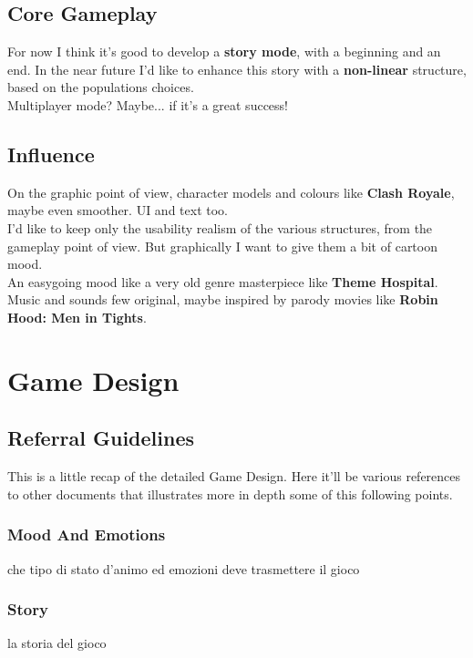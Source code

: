 \documentclass[a4paper]{scrreprt}
\begin{document}
\section{Core Gameplay}
For now I think it's good to develop a \textbf{story mode}, with a beginning and an end. In the near future I'd like to enhance this story with a \textbf{non-linear} structure, based on the populations choices.\\
Multiplayer mode? Maybe... if it's a great success!

\section{Influence}
On the graphic point of view, character models and colours like \textbf{Clash Royale}, maybe even smoother. UI and text too.\\
I'd like to keep only the usability realism of the various structures, from the gameplay point of view. But graphically I want to give them a bit of cartoon mood.\\
An easygoing mood like a very old genre masterpiece like \textbf{Theme Hospital}.\\
Music and sounds few original, maybe inspired by parody movies like \textbf{Robin Hood: Men in Tights}.


\chapter{Game Design} 

\section{Referral Guidelines}
This is a little recap of the detailed Game Design. Here it'll be various references to other documents that illustrates more in depth some of this following points. 

\subsection{Mood And Emotions}
che tipo di stato d'animo ed emozioni deve trasmettere il gioco

\subsection{Story}
la storia del gioco
\end{document}
